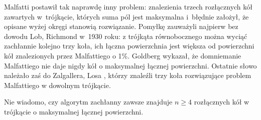 Malfatti postawił tak naprawdę inny problem: znalezienia trzech rozłącznych kół zawartych w~trójkącie, których suma pól jest maksymalna i~błędnie założył, że opisane wyżej okręgi stanowią rozwiązanie.
Pomyłkę zauważyli najpierw bez dowodu Lob, Richmond \cite{lob_richmond_1930} w~1930 roku: z trójkąta równobocznego można wyciąć zachłannie kolejno trzy koła, ich łączna powierzchnia jest większa od powierzchni kół znalezionych przez Malfattiego o 1\%.
%
%
Goldberg \cite{goldberg_1967} wykazał, że domniemanie Malfattiego nie daje nigdy kół o maksymalnej łącznej powierzchni.
Ostatnie słowo należało zaś do Zalgallera, Losa \cite{zalgaller_los_1992}, którzy znaleźli trzy koła rozwiązujące problem Malfattiego w dowolnym trójkącie.
%
%

Nie wiadomo, czy algorytm zachłanny zawsze znajduje $n \ge 4$ rozłącznych kół w trójkącie o maksymalnej łącznej powierzchni.

%